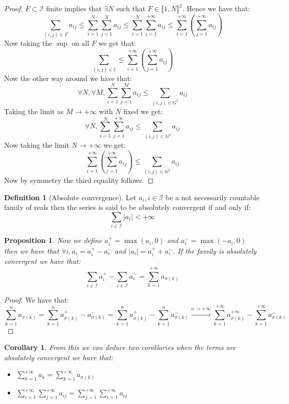 \documentclass[10pt,a4paper]{book}
\newtheorem{corollary}{Corollary}[theorem]
\newtheorem{proposition}{Proposition}[section]
\theoremstyle{definition}
\newtheorem{definition}{Definition}[section]
\begin{document}
\begin{proof}

$F \subset \mathcal{I}$ finite implies that $\exists N$ such that $F \in \llbracket 1, N \rrbracket^2$. Hence we have that:
\[
\sum_{(i, j) \in F} a_{ij} \leq \sum_{i = 1}^N \sum_{j = 1}^N a_{ij} \leq \sum_{i = 1}^N \sum_{j = 1}^{+\infty} a_{ij} \leq \sum_{i = 1}^{+\infty} \left( \sum_{j = 1}^{+\infty} a_{ij} \right)
\] 
Now taking the $\sup$ on all $F$ we get that:
\[
\sum_{(i, j) \in \mathbb{I}} \leq \sum_{i = 1}^{+\infty} \left( \sum_{j = 1}^{+\infty} a_{ij} \right)
\]
Now the other way around we have that:
\[
\forall N, \forall M, \sum_{i = 1}^N \sum_{j = 1}^M a_{ij} \leq \sum_{(i, j) \in \mathbb{N}^2} a_{ij}
\]
Taking the limit as $M \to +\infty$ with $N$ fixed we get: 
\[
\forall N, \sum_{i = 1}^N \sum_{j = 1}^{+\infty} a_{ij} \leq \sum_{(i, j) \in \mathbb{N}^2} a_{ij}
\]
Now taking the limit $N \to +\infty$ we get:
\[
\sum_{i = 1}^{+\infty} \left(\sum_{j = 1}^{+\infty} a_{ij}\right) \leq \sum_{(i, j) \in \mathbb{N}^2} a_{ij}
\]
Now by symmetry the third equality follows.
\end{proof}

\begin{definition}[Absolute convergence]
Let $a_i, i \in \mathcal{I}$ be a not necessarily countable family of reals then the series is said to be absolutely convergent if and only if:
\[
\sum_{i \in \mathcal{I}} |a_i| < + \infty
\]
\end{definition}

\begin{proposition}
Now we define $a_i^+ = \max(a_i, 0)$ and $a_i^- = \max(-a_i, 0)$ then we have that $\forall i, a_i = a_i^+ - a_i^-$ and $|a_i| = a_i^+ + a_i^-$. If the family is absolutely convergent we have that: 
\[
\sum_{i \in \mathcal{I}} a_i^+ - \sum_{i \in \mathcal{I}} a_i^- = \sum_{k = 1}^{+\infty} a_{\sigma(k)}
\]
\end{proposition}

\begin{proof}
We have that:
\[
\sum_{k = 1}^{n} a_{\sigma(k)} = \sum_{k = 1}^n a^+_{\sigma(k)} - a_{\sigma(k)}^- = \sum_{k = 1}^n a^+_{\sigma(k)} - \sum_{k = 1}^n a_{\sigma(k)}^-  \stackrel{n \to +\infty}{\longrightarrow}\sum_{k = 1}^{+\infty} a_{\sigma(k)}^{+\infty} - \sum_{k = 1}^{+\infty} a_{\sigma(k)}^-
\]
\end{proof}

\begin{corollary}

From this we can deduce two corollaries when the terms are absolutely convergent we have that:
\begin{itemize}
\item  $ \sum_{k = 1}^{+\infty} a_k = \sum_{k = 1}^{+\infty} a_{\sigma(k)} $
\item $\sum_{i = 1}^{+\infty} \sum_{j = 1}^{+\infty} a_{ij} = \sum_{j = 1}^{+\infty} \sum_{i = 1}^{+\infty} a_{ij}$
\end{itemize}

\end{corollary}
\end{document}
